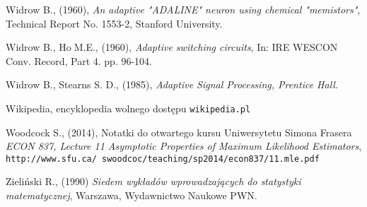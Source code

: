 \begin{thebibliography}{99}
 Widrow B., (1960), \textit{An adaptive "ADALINE" neuron using chemical "memistors"}, Technical Report No. 1553-2, Stanford University.

 Widrow B., HoM.E., (1960), \textit{Adaptive switching circuits}, In: IRE WESCON Conv.
Record, Part 4. pp. 96-104.

 Widrow B., Stearns S. D., (1985), \textit{Adaptive Signal Processing, Prentice Hall}.

 Wikipedia, encyklopedia wolnego dostępu \texttt{wikipedia.pl}
 
  Woodcock S., (2014), Notatki do otwartego kursu Uniwersytetu Simona Frasera \textit{ECON 837, Lecture 11 Asymptotic Properties of Maximum Likelihood Estimators}, \\ \texttt{http://www.sfu.ca/~swoodcoc/teaching/sp2014/econ837/11.mle.pdf}
 
 Zieliński R., (1990) \textit{Siedem wykładów wprowadzających do statystyki matematycznej}, Warszawa, Wydawnictwo Naukowe PWN.


\end{thebibliography}